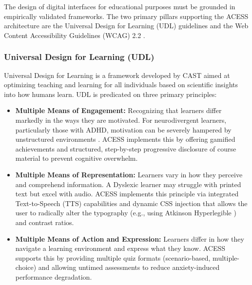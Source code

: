 \documentclass[12pt, oneside]{article} %
\begin{document}
The design of digital interfaces for educational purposes must be grounded in empirically validated frameworks. The two primary pillars supporting the ACESS architecture are the Universal Design for Learning (UDL) guidelines \cite{udl_guidelines} and the Web Content Accessibility Guidelines (WCAG) 2.2 \cite{wcag22}.

\subsubsection{Universal Design for Learning (UDL)}
Universal Design for Learning is a framework developed by CAST \cite{udl_guidelines} aimed at optimizing teaching and learning for all individuals based on scientific insights into how humans learn. UDL is predicated on three primary principles:
\begin{itemize}
    \item \textbf{Multiple Means of Engagement:} Recognizing that learners differ markedly in the ways they are motivated. For neurodivergent learners, particularly those with ADHD, motivation can be severely hampered by unstructured environments \cite{barkley1997adhd}. ACESS implements this by offering gamified achievements and structured, step-by-step progressive disclosure of course material to prevent cognitive overwhelm.
    \item \textbf{Multiple Means of Representation:} Learners vary in how they perceive and comprehend information. A Dyslexic learner may struggle with printed text but excel with audio. ACESS implements this principle via integrated Text-to-Speech (TTS) capabilities and dynamic CSS injection that allows the user to radically alter the typography (e.g., using Atkinson Hyperlegible \cite{atkinson2021atkinson}) and contrast ratios.
    \item \textbf{Multiple Means of Action and Expression:} Learners differ in how they navigate a learning environment and express what they know. ACESS supports this by providing multiple quiz formats (scenario-based, multiple-choice) and allowing untimed assessments to reduce anxiety-induced performance degradation.
\end{itemize}
\end{document}
